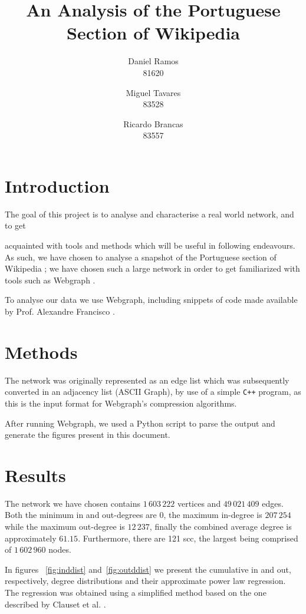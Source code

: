 \documentclass[9pt,a4paper,twocolumn]{article}
\title{An Analysis of the Portuguese Section of Wikipedia}
\author{Daniel Ramos \\ 81620 \and Miguel Tavares \\ 83528 \and Ricardo Brancas  \\ 83557}
\begin{document}
\maketitle

\section{Introduction}
The goal of this project is to analyse and characterise a real world network, and to  get 

acquainted with tools and methods which will be useful in following endeavours.
As such, we have chosen to analyse a snapshot of the Portuguese section of Wikipedia \cite{dataset};
we have chosen such a large network in order to get familiarized with tools such as Webgraph \cite{webgraph}.


To analyse our data we use Webgraph, including snippets of code made available
by Prof. Alexandre Francisco \cite{aplf}.

\section{Methods}
The network was originally represented as an edge list which was subsequently converted in an adjacency list (ASCII Graph), by use of a simple \texttt{C++} program, as this is the input
format for Webgraph's compression algorithms.

After running Webgraph, we used a Python script to parse the output and generate the figures present in this document.


\section{Results}

The network we have chosen contains $1\,603\,222$ vertices and $49\,021\,409$ edges. Both the minimum in and out-degrees are $0$, the maximum in-degree is $207\,254$ while the maximum out-degree is $12\,237$, finally the combined average degree is approximately $61.15$. Furthermore, there are 121 \acrlong{scc}, the largest being comprised of $1\,602\,960$ nodes.
\vspace{1\baselineskip}

In figures ~\ref{fig:inddist} and~\ref{fig:outddist} we present the cumulative in and out, respectively, degree distributions and their approximate power law regression. The regression was obtained using a simplified method based on the one described by Clauset et al. \cite{Clauset2009}.
\end{document}
